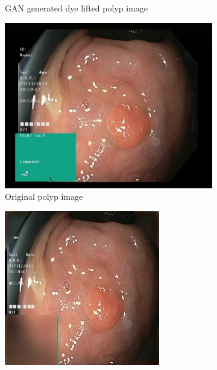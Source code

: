 \begin{figure}[h]
\begin{subfigure}[t]{\myfigsizethree}
            \caption{GAN generated dye lifted polyp image}    
            \label{fig:dlp_GAN_BOTH2}
        \end{subfigure}
        \qquad\vfill%
		\begin{subfigure}[t]{\myfigsizethree}   
            \centering 
            \includegraphics[height=\textwidth ,width=\textwidth]{experiments/figures/both/greenORIG.jpg}
            \caption{Original polyp image}    
            \label{fig:p_ORIG_BOTH2}
        \end{subfigure}
        \qquad
        \begin{subfigure}[t]{\myfigsizethree}   
            \centering 
            \includegraphics[width=\textwidth]{experiments/figures/both/greenAE.jpg}

\end{subfigure}
\end{figure}
